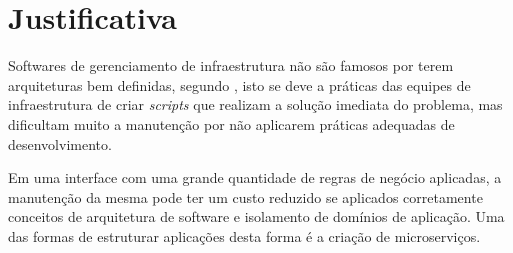 \section{Justificativa}

  Softwares de gerenciamento de infraestrutura não são famosos por terem
  arquiteturas bem definidas, segundo \cite{Tobin2006}, isto
  se deve a práticas das equipes de infraestrutura de criar \textit{scripts}
  que realizam a solução imediata do problema, mas dificultam muito a
  manutenção por não aplicarem práticas adequadas de desenvolvimento.

  Em uma interface com uma grande quantidade de regras de negócio aplicadas,
  a manutenção da mesma pode ter um custo reduzido se aplicados corretamente
  conceitos de arquitetura de software e isolamento de domínios de aplicação.
  Uma das formas de estruturar aplicações desta forma é a criação de
  microserviços.

